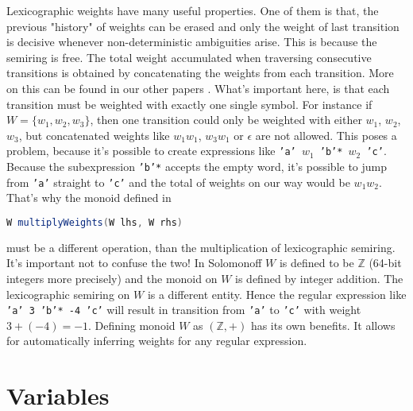\documentclass[12pt]{article}
\begin{document}
Lexicographic weights have many useful properties. One of them is that, the previous "history" of weights can be erased and only the weight of last transition is decisive whenever non-deterministic ambiguities arise. This is because the semiring is free. The total weight accumulated when traversing consecutive transitions is obtained by concatenating the weights from each transition. More on this can be found in our other papers \cite{MendozaDrosik2020MultitapeAA}. What's important here, is that each transition must be weighted with exactly one single symbol. For instance if $W=\{w_1,w_2,w_3\}$, then one transition could only be weighted with either $w_1$, $w_2$, $w_3$, but concatenated weights like $w_1w_1$, $w_3w_1$ or $\epsilon$ are not allowed. This poses a problem, because it's possible to create expressions like \texttt{'a' $w_1$ 'b'* $w_2$ 'c'}. Because the subexpression \texttt{'b'*} accepts the empty word, it's possible to jump from \texttt{'a'} straight to \texttt{'c'} and the total of weights on our way would be $w_1 w_2$. That's why the monoid defined in
\begin{lstlisting}[language=java]
W multiplyWeights(W lhs, W rhs)
\end{lstlisting}
must be a different operation, than the multiplication of lexicographic semiring. It's important not to confuse the two!
In Solomonoff $W$ is defined to be $\mathbb{Z}$ (64-bit integers more precisely) and the monoid on $W$ is defined by integer addition. The lexicographic semiring on $W$ is a different entity. Hence the regular expression like \texttt{'a' 3 'b'* -4 'c'} will result in transition from \texttt{'a'} to \texttt{'c'} with weight $3+(-4)=-1$. Defining monoid $W$ as $(\mathbb{Z},+)$ has its own benefits. It allows for automatically inferring weights for any regular expression.


\section{Variables}
\end{document}

